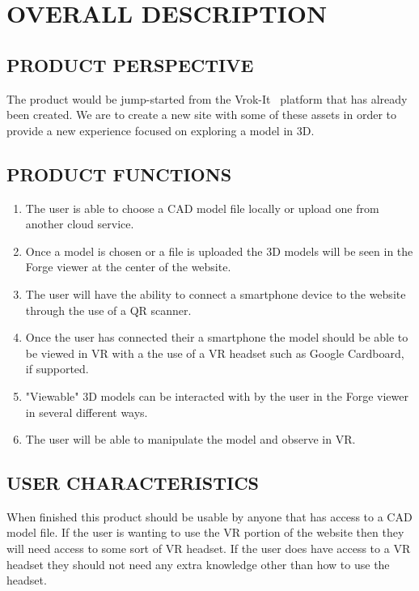 \documentclass[letterpaper, 10pt, draftclsnofoot, compsoc, onecolumn]{IEEEtran}
\begin{document}
\clearpage

\section{OVERALL DESCRIPTION}

\subsection{PRODUCT PERSPECTIVE}
	The product would be jump-started from the Vrok-It~\cite{Vrok-It2016} platform that has already been created. 
	We are to create a new site with some of these assets in order to provide a new experience focused on exploring a model in 3D. 

\subsection{PRODUCT FUNCTIONS}
	\begin{enumerate}
	 	\item The user is able to choose a CAD model file locally or upload one from another cloud service.
	 	
		\item Once a model is chosen or a file is uploaded the 3D models will be seen in the Forge viewer at the center of the website.
		
		\item The user will have the ability to connect a smartphone device to the website through the use of a QR scanner.

		\item Once the user has connected their a smartphone the model should be able to be viewed in VR with a the use of a VR headset such as Google Cardboard, if supported. 
		
		\item "Viewable" 3D models can be interacted with by the user in the Forge viewer in several different ways.		
		
		\item The user will be able to manipulate the model and observe in VR.
	\end{enumerate}

\subsection{USER CHARACTERISTICS}
	When finished this product should be usable by anyone that has access to a CAD model file. If the user is wanting to use the VR 
	portion of the website then they will need access to some sort of VR headset. If the user does have access to a VR headset they 
	should not need any extra knowledge other than how to use the headset.  
\end{document}
